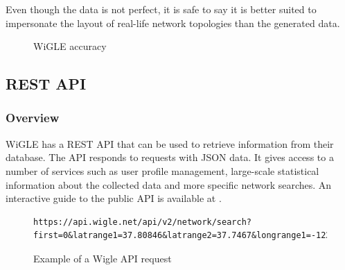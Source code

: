Even though the data is not perfect, it is safe to say it is better suited to impersonate the layout of real-life network topologies than the generated data.

\begin{figure}
	\centering
		\qquad
		\caption{WiGLE accuracy}%
		\label{fig:wiglediff}%
\end{figure}

	\subsection{REST API}
	\subsubsection{Overview}
	WiGLE has a REST API that can be used to retrieve information from their database. The API responds to requests with JSON data. It gives access to a
	number of services such as user profile management, large-scale statistical information about the collected data
	and more specific network searches. An interactive guide to the public API is available at \cite{WigleAPI}. 

\begin{figure}
	\scriptsize
	\begin{lstlisting}[breaklines]
	 https://api.wigle.net/api/v2/network/search?first=0&latrange1=37.80846&latrange2=37.7467&longrange1=-122.5392&longrange2=-122.3813&start=0
	\end{lstlisting}
	\caption{Example of a Wigle API request}
	\label{fig:wigReq}
\end{figure}



